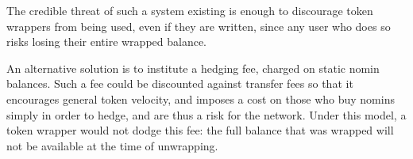 \noindent The credible threat of such a system existing is enough to
discourage token wrappers from being used, even if they are written, since
any user who does so risks losing their entire wrapped balance.

\noindent An alternative solution is to institute a hedging fee, charged on static nomin
balances. Such a fee could be discounted against transfer fees so that it
encourages general token velocity, and imposes a cost on those who buy nomins
simply in order to hedge, and are thus a risk for the network. Under this
model, a token wrapper would not dodge this fee: the full balance that was
wrapped will not be available at the time of unwrapping.
